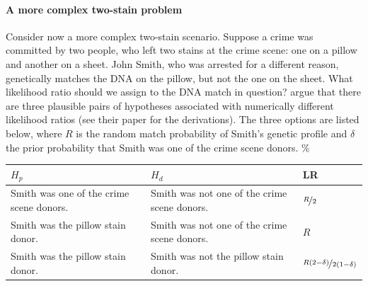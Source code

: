 \documentclass[10pt,dvipsnames,enabledeprecatedfontcommands]{scrartcl}
\let\oldparagraph\paragraph
\renewcommand{\paragraph}[1]{\oldparagraph{#1}\mbox{}}
\begin{document}
\paragraph{A more complex two-stain problem}

Consider now a more complex two-stain scenario. Suppose a crime was
committed by two people, who left two stains at the crime scene: one on
a pillow and another on a sheet. John Smith, who was arrested for a
different reason, genetically matches the DNA on the pillow, but not the
one on the sheet. What likelihood ratio should we assign to the DNA
match in question? \cite{meester2004WhyEffectPriora} argue that there
are three plausible pairs of hypotheses associated with numerically
different likelihood ratios (see their paper for the derivations). The
three options are listed below, where \(R\) is the random match
probability of Smith's genetic profile and \(\delta\) the prior
probability that Smith was one of the crime scene donors. \%

\begin{center}
    \footnotesize
    \begin{tabular}{@{}p{5cm}p{5cm}l@{}}
        \toprule
        $H_p$ & $H_d$  & LR \\ \midrule
        Smith was one of the crime scene donors.   &  Smith was not one of the crime scene donors. & $\nicefrac{R}{2}$   \\
        Smith was the pillow stain donor.     & Smith was not one of the crime scene donors.& $R$\\
        Smith was the pillow stain donor. & Smith was not the pillow stain donor. &  $\nicefrac{R(2-\delta)}{2(1-\delta)}$
        \\ \bottomrule
    \end{tabular}
\end{center}

\normalsize

\noindent
\end{document}
